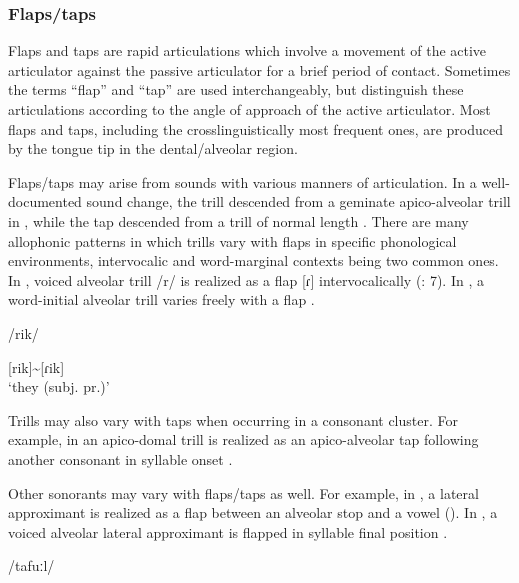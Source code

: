\subsubsection{{Flaps/taps} }\label{sec:4.5.3.2}

  Flaps and taps are rapid articulations which involve a movement of the active articulator against the passive articulator for a brief period of contact. Sometimes the terms ``flap'' and ``tap'' are used interchangeably, but \citet{LadefogedMaddieson1996} distinguish these articulations according to the angle of approach of the active articulator. Most flaps and taps, including the crosslinguistically most frequent ones, are produced by the tongue tip in the dental/alveolar region.

  Flaps/taps may arise from sounds with various manners of articulation. In a well-documented sound change, the  trill descended from a geminate apico-alveolar trill in , while the  tap descended from a trill of normal length \citep[17--18]{Hualde2004}. There are many allophonic patterns in which trills vary with flaps in specific phonological environments, intervocalic and word-marginal contexts being two common ones. In , voiced alveolar trill /r/ is realized as a flap [ɾ] intervocalically (\citealt{BlackBlack1971}: 7). In , a word-initial alveolar trill varies freely with a flap .

\noindent\parbox{\textwidth}{\ea\label{ex:4.52}

/rik/

[rik]{\textasciitilde}[ɾik]\\
\glt ‘they (subj. pr.)’
\citep[14]{Beaumont1979}
\z}

Trills may also vary with taps when occurring in a consonant cluster. For example, in  an apico-domal trill is realized as an apico-alveolar tap following another consonant in syllable onset \citep[3]{Merrifield1963}. 

  Other sonorants may vary with flaps/taps as well. For example, in , a lateral approximant is realized as a flap between an alveolar stop and a vowel (\citealt{BearthZemp1967}). In , a voiced alveolar lateral approximant is flapped in syllable final position .

\ea\label{ex:4.53}

/tafuːl/

